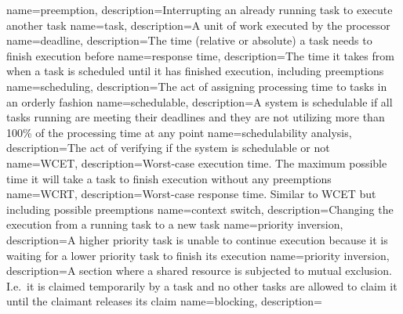 {
    name=preemption,
    description={Interrupting an already running task to execute another task}
}
{
    name=task,
    description={A unit of work executed by the processor}
}
{
    name=deadline,
    description={The time (relative or absolute) a task needs to finish execution before}
}
{
    name=response time,
    description={The time it takes from when a task is scheduled until it has finished
    execution, including preemptions}
}
{
    name=scheduling,
    description={The act of assigning processing time to tasks in an orderly fashion}
}
{
    name=schedulable,
    description={A system is schedulable if all tasks running are meeting their
    deadlines and they are not utilizing more than 100\% of the processing time
    at any point}
}
{
    name=schedulability analysis,
    description={The act of verifying if the system is schedulable or not}
}
{
    name=WCET,
    description={Worst-case execution time. The maximum possible time it will
    take a task to finish execution without any preemptions}
}
{
    name=WCRT,
    description={Worst-case response time. Similar to WCET but including possible
    preemptions}
}
{
    name=context switch,
    description={Changing the execution from a running task to a new task}
}
{
    name=priority inversion,
    description={A higher priority task is unable to continue execution because
    it is waiting for a lower priority task to finish its execution}
}
{
    name=priority inversion,
    description={A section where a shared resource is subjected to mutual exclusion.
    I.e.\ it is claimed temporarily by a task and no other tasks are allowed to claim
    it until the claimant releases its claim}
}
{
    name=blocking,
    description={}
}
